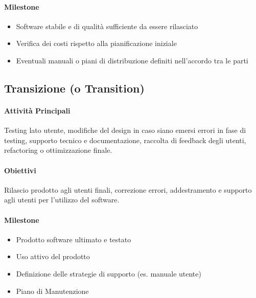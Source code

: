 \paragraph{Milestone}
\begin{itemize}
    \item Software stabile e di qualità sufficiente da essere rilasciato
    \item Verifica dei costi rispetto alla pianificazione iniziale
    \item Eventuali manuali o piani di distribuzione definiti nell'accordo tra le parti
\end{itemize}
\subsection{Transizione (o Transition)}
\label{concept:transizione}
\paragraph{Attività Principali} Testing lato utente, modifiche del design in caso siano emersi errori in fase di testing, supporto tecnico e documentazione, raccolta di feedback degli utenti, refactoring o ottimizzazione finale.
\paragraph{Obiettivi} Rilascio prodotto agli utenti finali, correzione errori, addestramento e supporto agli utenti per l'utilizzo del software.
\paragraph{Milestone}
\begin{itemize}
    \item Prodotto software ultimato e testato
    \item Uso attivo del prodotto
    \item Definizione delle strategie di supporto (es. manuale utente)
    \item Piano di Manutenzione
\end{itemize}
